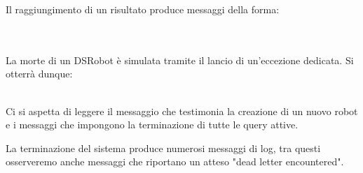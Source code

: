 Il raggiungimento di un risultato produce messaggi della forma:\\
\\
\\

La morte di un DSRobot è simulata tramite il lancio di un'eccezione dedicata. Si otterrà dunque:\\
\\

Ci si aspetta di leggere il messaggio che testimonia la creazione di un nuovo robot
e i messaggi che impongono la terminazione di tutte le query attive.\\

La terminazione del sistema produce numerosi messaggi di log, tra questi
osserveremo anche messaggi che riportano un atteso "dead letter encountered".
